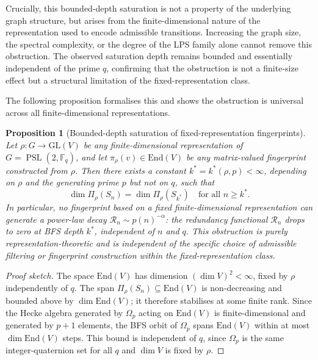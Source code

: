 \documentclass[11pt]{article}
\newtheorem{proposition}[theorem]{Proposition}
\theoremstyle{definition}
\theoremstyle{remark}
\DeclareMathOperator{\PSL}{PSL}
\newcommand{\F}{\mathbb{F}}
\newcommand{\Rn}{\mathcal{R}_n}
\begin{document}
    Crucially, this bounded-depth saturation is not a property of the underlying graph
    structure, but arises from the finite-dimensional nature of the representation used to
    encode admissible transitions.
    Increasing the graph size, the spectral complexity, or the degree of the LPS family
    alone cannot remove this obstruction.
    The observed saturation depth remains bounded and essentially independent of the prime $q$,
    confirming that the obstruction is not a finite-size effect but a structural limitation
    of the fixed-representation class.

    The following proposition formalises this and shows the obstruction is universal
    across all finite-dimensional representations.

    \begin{proposition}[Bounded-depth saturation of fixed-representation fingerprints]
      \label{prop:bounded-depth}
      Let $\rho: G \to \mathrm{GL}(V)$ be any finite-dimensional representation of
      $G = \PSL(2, \F_q)$, and let $\pi_\rho(v) \in \mathrm{End}(V)$ be any matrix-valued
      fingerprint constructed from $\rho$.
      Then there exists a constant $k^* = k^*(\rho, p) < \infty$, depending on $\rho$ and
      the generating prime $p$ but \emph{not} on $q$, such that
      \[
        \dim \Pi_\rho(S_n) = \dim \Pi_\rho(S_{k^*}) \quad \text{for all } n \geq k^*.
      \]
      In particular, no fingerprint based on a fixed finite-dimensional representation
      can generate a power-law decay $\Rn \sim p(n)^{-\alpha}$: the redundancy functional
      $\Rn$ drops to zero at BFS depth $k^*$, independent of $n$ and $q$.
      This obstruction is purely representation-theoretic and is independent of the specific
      choice of admissible filtering or fingerprint construction within the fixed-representation
      class.
    \end{proposition}

    \begin{proof}[Proof sketch]
The space $\mathrm{End}(V)$ has dimension $(\dim V)^2 < \infty$, fixed by $\rho$
independently of $q$.
The span $\Pi_\rho(S_n) \subseteq \mathrm{End}(V)$ is non-decreasing and bounded
above by $\dim \mathrm{End}(V)$; it therefore stabilises at some finite rank.
Since the Hecke algebra generated by $\Omega_p$ acting on $\mathrm{End}(V)$ is
finite-dimensional and generated by $p+1$ elements, the BFS orbit of $\Omega_p$
spans $\mathrm{End}(V)$ within at most $\dim \mathrm{End}(V)$ steps.
This bound is independent of $q$, since $\Omega_p$ is the same integer-quaternion
set for all $q$ and $\dim V$ is fixed by $\rho$.
    \end{proof}
\end{document}
